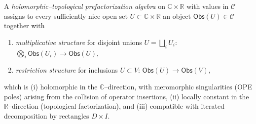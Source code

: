 \begin{definition}
\label{def:HT-prefactorization}
A \emph{holomorphic--topological prefactorization algebra} on $\mathbb C\times\mathbb R$ with values
in $\mathcal C$ assigns to every sufficiently nice open set $U\subset\mathbb C\times\mathbb R$ an
object $\mathsf{Obs}(U)\in\mathcal C$ together with
\begin{enumerate}[label=(\alph*)]
\item \emph{multiplicative structure} for disjoint unions
 $U=\bigsqcup_i U_i$:
 \(
 \bigotimes_i \mathsf{Obs}(U_i)\to \mathsf{Obs}(U),
 \)
\item \emph{restriction structure} for inclusions $U\subset V$:
 \(
 \mathsf{Obs}(U)\to \mathsf{Obs}(V),
 \)
\end{enumerate}
which is (i) holomorphic in the $\mathbb C$--direction, with meromorphic singularities (OPE poles) arising from the collision of operator insertions,
(ii) locally constant in the $\mathbb R$--direction (topological factorization),
and (iii) compatible with iterated decomposition by rectangles $D\times I$.
\end{definition}

